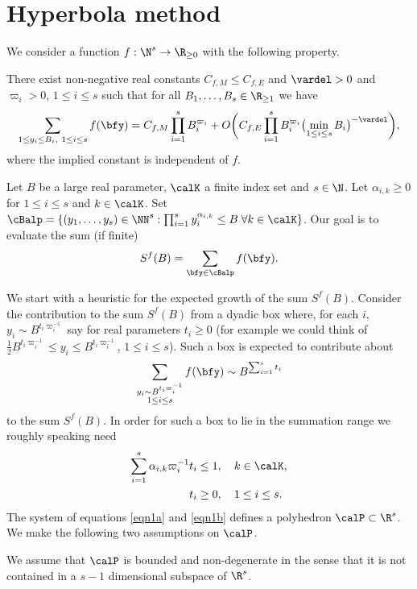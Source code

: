 \section{Hyperbola method}
\label{sec:hyperbola_method}

We consider a function $f: \N^s\rightarrow \R_{\geq 0}$ with the following property.

\begin{property}\label{property:I}
There exist non-negative real constants $C_{f,M}\leq C_{f,E}$ and $\vardel>0$ and $\varpi_i>0$, $1\leq i\leq s$ such that for all $B_1,\ldots, B_s\in \R_{\geq 1}$ we have\vspace*{-3pt}
\[
\sum_{1\leq y_i\leq B_i,\ 1\leq i\leq s} f(\bfy)= C_{f,M} \prod_{i=1}^s B_i^{\varpi_i} +O\biggl(C_{f,E} \prod_{i=1}^s B_i^{\varpi_i} \bigl(\min_{1\leq i\leq s} B_i\bigr)^{-\vardel}\biggr),
\]
where the implied constant is independent of $f$.
\end{property}

Let $B$ be a large real parameter, $\calK$ a finite index set and $s\in \N$. Let $\alpha_{i,k}\geq 0$ for $1\leq i\leq s$ and $k\in \calK$. Set $\cBalp=\{(y_1,\dots,y_s)\in\NN^s:\prod_{i=1}^sy_i^{\alpha_{i,k}}\leq B\;\forall k\in\calK\}$. Our goal is to evaluate the sum (if finite)\vspace*{-3pt}
\[
S^{f}(B)=\sum_{\bfy\in\cBalp}f(\bfy).
\]

We start with a heuristic for the expected growth of the sum $S^f(B)$. Consider the contribution to the sum $S^f(B)$ from a dyadic box where, for each $i$, $y_i\sim B^{t_i\varpi_i^{-1}}$ say for real parameters $t_i\geq 0$ (for example we could think of $\tfrac{1}{2} B^{t_i\varpi_i^{-1}}\leq y_i\leq B^{t_i\varpi_i^{-1}}$, $1\leq i\leq s$). Such a box is expected to contribute about
\[
\sum_{\substack{y_i\sim B^{t_i\varpi_i^{-1}}\\ 1\leq i\leq s}} f(\bfy) \sim B^{\sum_{i=1}^s t_i}
\]
to the sum $S^f(B)$.
In order for such a box to lie in the summation range we roughly speaking need\vspace*{-4pt}
\begin{align}\label{eqn1a}
\sum_{i=1}^s \alpha_{i,k} \varpi_i^{-1} t_i&\leq 1, \quad k\in \calK,
\\
\label{eqn1b}
t_i&\geq 0,\quad 1\leq i\leq s.
\end{align}
The system of equations \eqref{eqn1a} and \eqref{eqn1b} defines a polyhedron $\calP \subset \R^s$. We make the following two assumptions on $\calP$.

\begin{assumption}\label{assp10}
We assume that $\calP$ is bounded and non-degenerate in the sense that it is not contained in a $s-1$ dimensional subspace of $\R^s$.
\end{assumption}

